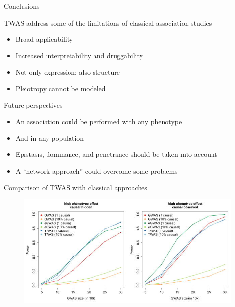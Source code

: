 \documentclass[aspectratio=169,12pt]{beamer}
\begin{document}
\begin{frame}{Conclusions}

	TWAS address some of the limitations of classical association 
studies

	\begin{itemize}
		\item Broad applicability
		\item Increased interpretability and druggability
		\item Not only expression: also structure
	\end{itemize}

	\begin{itemize}
		\item Pleiotropy cannot be modeled
	\end{itemize}

\end{frame}

\begin{frame}{Future perspectives}

	\begin{itemize}
		\item<1-> An association could be performed with any phenotype
		\item<2-> And in any population
		\item<3-> Epistasis, dominance, and penetrance should be taken 
into account
		\item<4-> A \enquote{network approach} could overcome some 
problems
	\end{itemize}

\end{frame}

\appendix

\begin{frame}[plain] %
	\nocite{*}
	\tiny
	\printbibliography[title=References,keyword=TWAS]
\end{frame}

\begin{frame}{Comparison of TWAS with classical approaches}

	\begin{figure}
		\includegraphics{gusev2016/5-association_power}
	\end{figure}


\end{frame}
\end{document}
